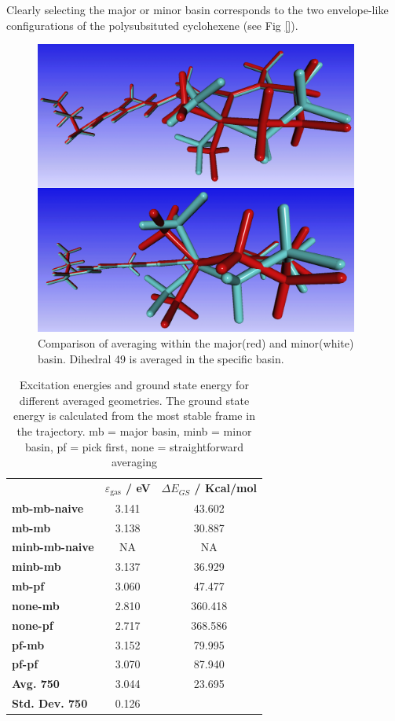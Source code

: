 \documentclass[twoside, 12pt]{article}
\begin{document}
Clearly selecting the major or minor basin corresponds to the two envelope-like configurations of the polysubsituted cyclohexene (see Fig \ref{}).

\begin{figure}[H]
\centering
\includegraphics[width=0.95\textwidth]{./figures/mb_minb_comp.png}
\caption{Comparison of averaging within the major(red) and minor(white) basin. Dihedral 49 is averaged in the specific basin.} 
\label{fig:dih49dih52}
\end{figure}

\begin{table}[h]
\footnotesize
\centering
\caption{Excitation energies and ground state energy for different averaged geometries. The ground state energy is calculated from the most stable frame in the trajectory. mb = major basin, minb = minor basin, pf = pick first, none = straightforward averaging}
\label{tab:ex_ret_avrg}
\begin{tabular}{lcc}
& \textbf{$\varepsilon_\mathrm{gas}$ / eV} & \textbf{$\Delta E_{GS}$ / Kcal/mol}  \\ 
\textbf{mb-mb-naive} & 3.141 & 43.602\\ 
\textbf{mb-mb} & 3.138 & 30.887\\
\textbf{minb-mb-naive} & NA & NA \\
\textbf{minb-mb} & 3.137 & 36.929\\
\textbf{mb-pf} & 3.060 & 47.477\\ 
\textbf{none-mb} & 2.810 & 360.418\\ 
\textbf{none-pf} & 2.717 & 368.586\\ 
\textbf{pf-mb} &  3.152 & 79.995\\ 
\textbf{pf-pf} & 3.070 & 87.940\\ 
\textbf{Avg. 750} &  3.044 & 23.695\\ 
\textbf{Std. Dev. 750} &  0.126\\ 
\end{tabular}
\end{table}
\end{document}
